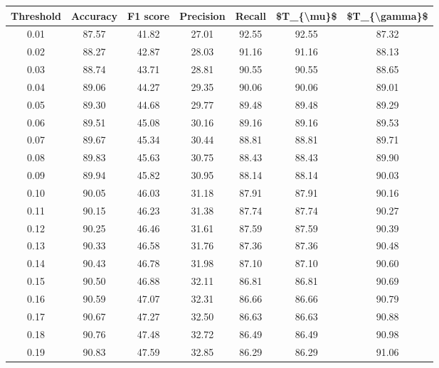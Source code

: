 \begin{tabular}{|c|c|c|c|c|c|c|}
\hline
 Threshold &  Accuracy &  F1 score &  Precision &  Recall &  \$T\_\{\textbackslash mu\}\$ &  \$T\_\{\textbackslash gamma\}\$ \\
\hline
      0.01 &     87.57 &     41.82 &      27.01 &   92.55 &      92.55 &         87.32 \\
      0.02 &     88.27 &     42.87 &      28.03 &   91.16 &      91.16 &         88.13 \\
      0.03 &     88.74 &     43.71 &      28.81 &   90.55 &      90.55 &         88.65 \\
      0.04 &     89.06 &     44.27 &      29.35 &   90.06 &      90.06 &         89.01 \\
      0.05 &     89.30 &     44.68 &      29.77 &   89.48 &      89.48 &         89.29 \\
      0.06 &     89.51 &     45.08 &      30.16 &   89.16 &      89.16 &         89.53 \\
      0.07 &     89.67 &     45.34 &      30.44 &   88.81 &      88.81 &         89.71 \\
      0.08 &     89.83 &     45.63 &      30.75 &   88.43 &      88.43 &         89.90 \\
      0.09 &     89.94 &     45.82 &      30.95 &   88.14 &      88.14 &         90.03 \\
      0.10 &     90.05 &     46.03 &      31.18 &   87.91 &      87.91 &         90.16 \\
      0.11 &     90.15 &     46.23 &      31.38 &   87.74 &      87.74 &         90.27 \\
      0.12 &     90.25 &     46.46 &      31.61 &   87.59 &      87.59 &         90.39 \\
      0.13 &     90.33 &     46.58 &      31.76 &   87.36 &      87.36 &         90.48 \\
      0.14 &     90.43 &     46.78 &      31.98 &   87.10 &      87.10 &         90.60 \\
      0.15 &     90.50 &     46.88 &      32.11 &   86.81 &      86.81 &         90.69 \\
      0.16 &     90.59 &     47.07 &      32.31 &   86.66 &      86.66 &         90.79 \\
      0.17 &     90.67 &     47.27 &      32.50 &   86.63 &      86.63 &         90.88 \\
      0.18 &     90.76 &     47.48 &      32.72 &   86.49 &      86.49 &         90.98 \\
      0.19 &     90.83 &     47.59 &      32.85 &   86.29 &      86.29 &         91.06 \\

\end{tabular}
